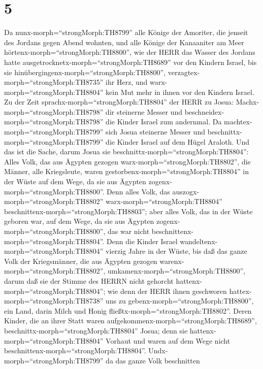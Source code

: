 \hypertarget{section-4}{%
\section{5}\label{section-4}}

 Da nunx-morph=``strongMorph:TH8799'' alle Könige der
Amoriter, die jenseit des Jordans gegen Abend wohnten, und alle Könige
der Kanaaniter am Meer hörtenx-morph=``strongMorph:TH8800'', wie der
HERR das Wasser des Jordans hatte
ausgetrocknetx-morph=``strongMorph:TH8689'' vor den Kindern Israel, bis
sie hinübergingenx-morph=``strongMorph:TH8800'',
verzagtex-morph=``strongMorph:TH8735'' ihr Herz, und
warx-morph=``strongMorph:TH8804'' kein Mut mehr in ihnen vor den Kindern
Israel.  Zu der Zeit sprachx-morph=``strongMorph:TH8804''
der HERR zu Josua: Machx-morph=``strongMorph:TH8798'' dir steinerne
Messer und beschneidex-morph=``strongMorph:TH8798'' die Kinder Israel
zum andernmal.  Da machtex-morph=``strongMorph:TH8799'' sich
Josua steinerne Messer und beschnittx-morph=``strongMorph:TH8799'' die
Kinder Israel auf dem Hügel Araloth.  Und das ist die Sache,
darum Josua sie beschnittx-morph=``strongMorph:TH8804'': Alles Volk, das
aus Ägypten gezogen warx-morph=``strongMorph:TH8802'', die Männer, alle
Kriegsleute, waren gestorbenx-morph=``strongMorph:TH8804'' in der Wüste
auf dem Wege, da sie aus Ägypten zogenx-morph=``strongMorph:TH8800''.
 Denn alles Volk, das auszogx-morph=``strongMorph:TH8802''
warx-morph=``strongMorph:TH8804''
beschnittenx-morph=``strongMorph:TH8803''; aber alles Volk, das in der
Wüste geboren war, auf dem Wege, da sie aus Ägypten
zogenx-morph=``strongMorph:TH8800'', das war nicht
beschnittenx-morph=``strongMorph:TH8804''.  Denn die Kinder
Israel wandeltenx-morph=``strongMorph:TH8804'' vierzig Jahre in der
Wüste, bis daß das ganze Volk der Kriegsmänner, die aus Ägypten gezogen
warenx-morph=``strongMorph:TH8802'',
umkamenx-morph=``strongMorph:TH8800'', darum daß sie der Stimme des
HERRN nicht gehorcht hattenx-morph=``strongMorph:TH8804''; wie denn der
HERR ihnen geschworen hattex-morph=``strongMorph:TH8738'' uns zu
gebenx-morph=``strongMorph:TH8800'', ein Land, darin Milch und Honig
fließtx-morph=``strongMorph:TH8802''.  Deren Kinder, die an
ihrer Statt waren aufgekommenx-morph=``strongMorph:TH8689'',
beschnittx-morph=``strongMorph:TH8804'' Josua; denn sie
hattenx-morph=``strongMorph:TH8804'' Vorhaut und waren auf dem Wege
nicht beschnittenx-morph=``strongMorph:TH8804''. 
Undx-morph=``strongMorph:TH8799'' da das ganze Volk beschnitten
